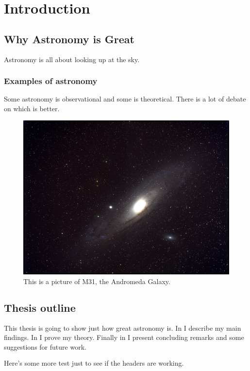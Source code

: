 \chapter{Introduction}
\label{chap:intro}

\section{Why Astronomy is Great}
\label{sec:why}

Astronomy is all about looking up at the sky.

\subsection{Examples of astronomy}
\label{sec:examples}

Some astronomy is observational and some is theoretical. There is a lot of debate on which is better.

\begin{figure}[t]
    \begin{center}
        \includegraphics[width=0.9\linewidth]{images/m31.jpg}
    \end{center}
    \caption[An image of M31]{
        This is a picture of M31, the Andromeda Galaxy.
        }\label{fig:m31}
\end{figure}

\section{Thesis outline}
\label{sec:outline}

This thesis is going to show just how great astronomy is. In  I describe my main findings. In  I prove my theory. Finally in  I present concluding remarks and some suggestions for future work.

\newpage

Here's some more test just to see if the headers are working.